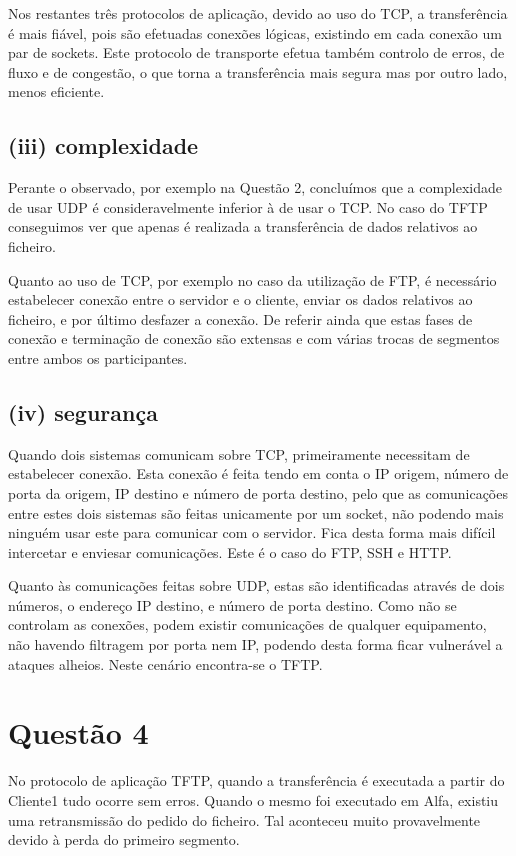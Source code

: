 \documentclass{llncs}
\begin{document}
Nos restantes três protocolos de aplicação, devido ao uso do TCP, a transferência é mais fiável, pois são efetuadas conexões lógicas, existindo em cada conexão um par de sockets. Este protocolo de transporte efetua também controlo de erros, de fluxo e de congestão, o que torna a transferência mais segura mas por outro lado, menos eficiente.

\subsection{(iii) complexidade}
Perante o observado, por exemplo na Questão 2, concluímos que a complexidade de usar UDP é consideravelmente inferior à de usar o TCP. No caso do TFTP conseguimos ver que apenas é realizada a transferência de dados relativos ao ficheiro.

Quanto ao uso de TCP, por exemplo no caso da utilização de FTP, é necessário estabelecer conexão entre o servidor e o cliente, enviar os dados relativos ao ficheiro, e por último desfazer a conexão. De referir ainda que estas fases de conexão e terminação de conexão são extensas e com várias trocas de segmentos entre ambos os participantes.

\subsection{(iv) segurança}
Quando dois sistemas comunicam sobre TCP, primeiramente necessitam de estabelecer conexão. Esta conexão é feita tendo em conta o IP origem, número de porta da origem, IP destino e número de porta destino, pelo que as comunicações entre estes dois sistemas são feitas unicamente por um socket, não podendo mais ninguém usar este para comunicar com o servidor. Fica desta forma mais difícil intercetar e enviesar comunicações. Este é o caso do FTP, SSH e HTTP.

Quanto às comunicações feitas sobre UDP, estas são identificadas através de dois números, o endereço IP destino, e número de porta destino. Como não se controlam as conexões, podem existir comunicações de qualquer equipamento, não havendo filtragem por porta nem IP, podendo desta forma ficar vulnerável a ataques alheios. Neste cenário encontra-se o TFTP.


\section{Questão 4}
No protocolo de aplicação TFTP, quando a transferência é executada a partir do Cliente1 tudo ocorre sem erros. Quando o mesmo foi executado em Alfa, existiu uma retransmissão do pedido do ficheiro. Tal aconteceu muito provavelmente devido à perda do primeiro segmento.
\end{document}
